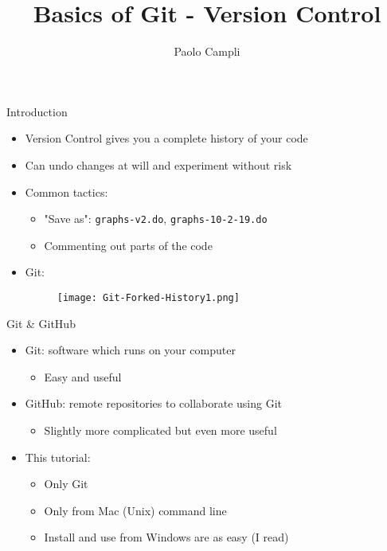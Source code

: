 \documentclass[12pt]{beamer}
\begin{document}
	\author{Paolo Campli}
		\vspace{1cm}
	\title{Basics of Git - Version Control}

	\begin{frame}[plain]
	\maketitle
	\end{frame}


\begin{frame}{Introduction}
\begin{itemize}
	\item Version Control gives you a complete history of your code
	\vspace{.1cm}
	\item Can undo changes at will and experiment without risk
	
	\vspace{.4cm}
	\item Common tactics:  
	\begin{itemize}
		\item "Save as": \texttt{graphs-v2.do}, \texttt{graphs-10-2-19.do} 
		
		\item Commenting out parts of the code
	\end{itemize}
	\vspace{.1cm}
	\item Git: 
	\begin{figure}
		\texttt{[image: Git-Forked-History1.png]}
	\end{figure}
\end{itemize}

\end{frame}



\begin{frame}{Git \& GitHub}
\begin{itemize}
	\item Git: software which runs on your computer
\begin{itemize}
	\item Easy and useful
\end{itemize}	
	\vspace{.3cm}
	\item GitHub: remote repositories to collaborate using Git
\begin{itemize}
	\item Slightly more complicated but even more useful
\end{itemize}
	\vspace{.5cm}
	
	\item This tutorial:
\begin{itemize}
	\item Only Git
	\item Only from Mac (Unix) command line
	\item Install and use from Windows are as easy (I read)
\end{itemize}	
\end{itemize}

\end{frame}
\end{document}
